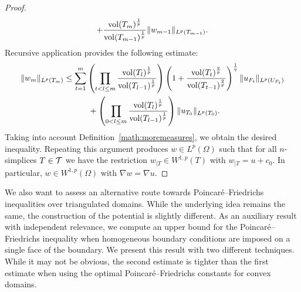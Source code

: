 \documentclass[10pt,letterpaper]{article}
\begin{document}
\begin{proof}
\begin{align*}
    +
    \frac{ \operatorname{vol}(T_m)^{\frac 1 p} }{ \operatorname{vol}(T_{{m-1}})^{\frac 1 p} }
    \| w_{m-1}\|_{L^{p}(T_{{m-1}})}
    .
 \end{align*}
 Recursive application provides the following estimate:
 \begin{align*}
    \| w_{m} \|_{L^{p}(T_m)}
    &\leq 
    \sum_{t=1}^{m} 
    \left( 
        \prod_{t < l \leq m} 
        \frac{ \operatorname{vol}(T_l)^{\frac 1 p} }{ \operatorname{vol}(T_{l-1})^{\frac 1 p} } 
    \right)
    \left( 1 + \frac{ \operatorname{vol}(T_t)^{\frac q p} }{ \operatorname{vol}(T_{t-1})^{\frac q p} } \right)^{\frac 1 q}
    \| u_{F_t} \|_{L^{p}(U_{F_t})}
    \\&\quad \quad \quad 
    +
    \left( 
        \prod_{0 < l \leq m} 
        \frac{ \operatorname{vol}(T_l)^{\frac 1 p} }{ \operatorname{vol}(T_{l-1})^{\frac 1 p} } 
    \right)
    \| u_{T_0}\|_{L^{p}(T_{0})}
    .
 \end{align*}
 Taking into account Definition~\eqref{math:moremeasures}, we obtain the desired inequality.
 Repeating this argument produces $w \in L^{p}(\Omega)$ 
 such that for all $n$-simplices $T \in {\mathcal T}$ we have the restriction $w_{|T} \in W^{1,p}(T)$ with $w_{|T} = u + c_{0}$.
 In particular, $w \in W^{1,p}(\Omega)$ with $\nabla w = \nabla u$.
\end{proof}








We also want to assess an alternative route towards Poincar\'e--Friedrichs inequalities over triangulated domains. 
While the underlying idea remains the same, the construction of the potential is slightly different. 
As an auxiliary result with independent relevance, we compute an upper bound for the Poincar\'e--Friedrichs inequality 
when homogeneous boundary conditions are imposed on a single face of the boundary. 
We present this result with two different techniques. 
While it may not be obvious, the second estimate is tighter than the first estimate when using the optimal Poincar\'e--Friedrichs constants for convex domains. 
\end{document}
